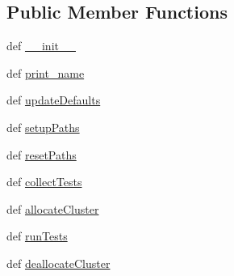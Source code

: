 \subsection*{Public Member Functions}
\begin{DoxyCompactItemize}
\item 
def \hyperlink{class_launcher_m_t_t_tool_1_1_launcher_m_t_t_tool_acfc089fc18fcde378ce794b64211d537}{\-\_\-\-\_\-init\-\_\-\-\_\-}
\item 
def \hyperlink{class_launcher_m_t_t_tool_1_1_launcher_m_t_t_tool_a07b353aff1a7768e40b46e67e47c9c21}{print\-\_\-name}
\item 
def \hyperlink{class_launcher_m_t_t_tool_1_1_launcher_m_t_t_tool_a40c4c403d5553eb13f91e91e8dc973f6}{update\-Defaults}
\item 
def \hyperlink{class_launcher_m_t_t_tool_1_1_launcher_m_t_t_tool_a0a3d37e54fc308a806e95816143059f5}{setup\-Paths}
\item 
def \hyperlink{class_launcher_m_t_t_tool_1_1_launcher_m_t_t_tool_a95b352e21a72a37e29645ab632a8fe5e}{reset\-Paths}
\item 
def \hyperlink{class_launcher_m_t_t_tool_1_1_launcher_m_t_t_tool_a3cd99128c246981fedf691483e21b79d}{collect\-Tests}
\item 
def \hyperlink{class_launcher_m_t_t_tool_1_1_launcher_m_t_t_tool_a60e6315e0652c6787600a1669e22e3a0}{allocate\-Cluster}
\item 
def \hyperlink{class_launcher_m_t_t_tool_1_1_launcher_m_t_t_tool_aed1deaa222bb1908e29562f51aadf65f}{run\-Tests}
\item 
def \hyperlink{class_launcher_m_t_t_tool_1_1_launcher_m_t_t_tool_ae446b720803ee6ba3ab9febc001573dd}{deallocate\-Cluster}
\end{DoxyCompactItemize}
